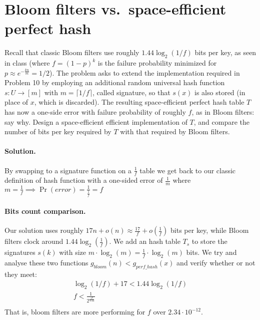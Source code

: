 \section{Bloom filters vs.\ space-efficient perfect hash}

Recall that classic Bloom filters use roughly $1.44\log_2(1/f)$ bits per key, as
seen in class (where $f=(1-p)^k$ is the failure probability minimized for
$p \approx e^{-\frac{kn}{m}} = 1/2$).
The problem asks to extend the implementation required in Problem 10 by employing
an additional random universal hash function $s : U \to [m]$ with $m = \lceil 1/f \rceil$,
called signature, so that $s(x)$ is also stored (in place of $x$, which is discarded).
The resulting space-efficient perfect hash table $T$ has now a one-side error with
failure probability of roughly $f$, as in Bloom filters: say why.
Design a space-efficient efficient implementation of $T$, and compare the number
of bits per key required by $T$ with that required by Bloom filters.

\vspace{0.5cm}
\paragraph{Solution.}
By swapping to a signature function on a $\frac{1}{f}$ table we get back to our classic definition of hash function with a one-sided error of $\frac{1}{m}$ where $m = \frac{1}{f} \implies \Pr(error) = \frac{1}{\frac{1}{f}} = f$

\paragraph{Bits count comparison.}
Our solution uses roughly $17n + o(n) \approx \frac{17}{f} + o(\frac{1}{f})$ bits
per key, while Bloom filters clock around $1.44 \log_2(\frac{1}{f})$.
We add an hash table $T_s$ to store the signatures $s(k)$ with size
$m \cdot \log_2(m) = \frac{1}{f} \cdot \log_2(m)$ bits.
We try and analyse these two functions $g_{bloom}(n) < g_{perf\_hash}(x)$ and verify
whether or not they meet:
\begin{align*}
\log_2(1/f) + 17 < 1.44 \log_2(1/f) \\
f < \frac{1}{2^{\frac{17}{0.44}}} \\
\end{align*}
That is, bloom filters are more performing for $f$ over $2.34\cdot10^{-12}$.
